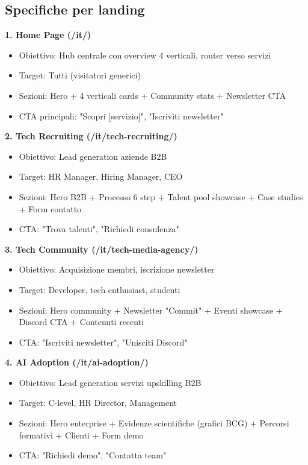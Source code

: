 \subsection{Specifiche per landing}
\textbf{1. Home Page (/it/)}
\begin{itemize}
  \item Obiettivo: Hub centrale con overview 4 verticali, 
        router verso servizi
  \item Target: Tutti (visitatori generici)
  \item Sezioni: Hero + 4 verticali cards + Community stats + 
        Newsletter CTA
  \item CTA principali: "Scopri [servizio]", "Iscriviti newsletter"
\end{itemize}

\textbf{2. Tech Recruiting (/it/tech-recruiting/)}
\begin{itemize}
  \item Obiettivo: Lead generation aziende B2B
  \item Target: HR Manager, Hiring Manager, CEO
  \item Sezioni: Hero B2B + Processo 6 step + Talent pool showcase + 
        Case studies + Form contatto
  \item CTA: "Trova talenti", "Richiedi consulenza"
\end{itemize}

\textbf{3. Tech Community (/it/tech-media-agency/)}
\begin{itemize}
  \item Obiettivo: Acquisizione membri, iscrizione newsletter
  \item Target: Developer, tech enthusiast, studenti
  \item Sezioni: Hero community + Newsletter "Commit" + Eventi showcase + 
        Discord CTA + Contenuti recenti
  \item CTA: "Iscriviti newsletter", "Unisciti Discord"
\end{itemize}

\textbf{4. AI Adoption (/it/ai-adoption/)}
\begin{itemize}
  \item Obiettivo: Lead generation servizi upskilling B2B
  \item Target: C-level, HR Director, Management
  \item Sezioni: Hero enterprise + Evidenze scientifiche (grafici BCG) + 
        Percorsi formativi + Clienti + Form demo
  \item CTA: "Richiedi demo", "Contatta team"
\end{itemize}

